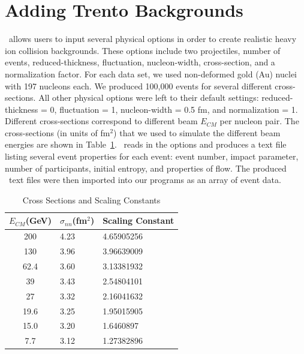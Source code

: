 \documentclass[11pt]{article}
\begin{document}
\section{Adding Trento Backgrounds}
%
%
\trento\ allows users to input several physical options in order to create realistic heavy ion collision backgrounds. These options include two projectiles, number of events, reduced-thickness, fluctuation, nucleon-width, cross-section, and a normalization factor. For each data set,  we used non-deformed gold (Au) nuclei with 197 nucleons each. We produced 100,000 events for several different cross-sections. All other physical options were left to their default settings: reduced-thickness = 0, fluctuation = 1, nucleon-width = 0.5 fm, and normalization = 1. Different cross-sections correspond to different beam $E_{CM}$ per nucleon pair. The cross-sections (in units of fm$^2$) that we used to simulate the different beam energies are shown in Table~\ref{tab_phenix_trento}. \trento\ reads in the options and produces a text file listing several event properties for each event: event number, impact parameter, number of participants, initial entropy, and properties of flow. The produced \trento\ text files were then imported into our programs as an array of event data.
%
\begin{center}
\begin{table}[th]
\centering
\caption{Cross Sections and Scaling Constants}
\label{tab_phenix_trento}
\begin{tabular}{|c|l|l|}
\hline
$E_{CM}$(GeV) & $\sigma_{nn}$(fm$^2$) & Scaling Constant \\
\hline
200 & 4.23 & 4.65905256 \\
\hline
130 & 3.96 & 3.96639009 \\
\hline
62.4 & 3.60 & 3.13381932 \\
\hline
39 & 3.43 & 2.54804101 \\
\hline
27 & 3.32 & 2.16041632 \\
\hline
19.6 & 3.25 & 1.95015905 \\
\hline
15.0 & 3.20 & 1.6460897 \\
\hline
7.7 & 3.12 & 1.27382896 \\
\hline
\end{tabular}
\end{table}
\end{center}
\end{document}
